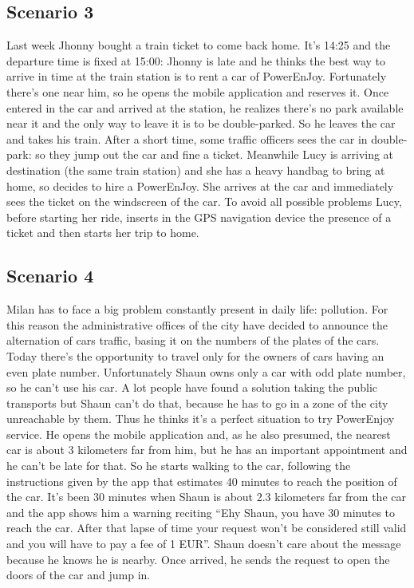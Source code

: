 \subsection{Scenario 3}
Last week Jhonny bought a train ticket to come back home.
It’s 14:25 and the departure time is fixed at 15:00: Jhonny is late and he thinks the best way to arrive in time at the train station is to rent a car of PowerEnJoy.
Fortunately there’s one near him, so he opens the mobile application and reserves it.
Once entered in the car and arrived at the station, he realizes there’s no park available near it and the only way to leave it is to be double-parked.
So he leaves the car and takes his train. After a short time, some traffic officers sees the car in double-park: so they jump out the car and fine a ticket.
Meanwhile Lucy is arriving at destination (the same train station) and she has a heavy handbag to bring at home, so decides to hire a PowerEnJoy.
She arrives at the car and immediately sees the ticket on the windscreen of the car.
To avoid all possible problems Lucy, before starting her ride, inserts in the GPS navigation device the presence of a ticket and then starts her trip to home.

\subsection{Scenario 4}
Milan has to face a big problem constantly present in daily life: pollution.
For this reason the administrative offices of the city have decided to announce the alternation of cars traffic, basing it on the numbers of the plates of the cars.
Today there’s the opportunity to travel only for the owners of cars having an even plate number.
Unfortunately Shaun owns only a car with odd plate number, so he can’t use his car.
A lot people have found a solution taking the public transports but Shaun can’t do that, because he has to go in a zone of the city unreachable by them.
Thus he thinks it’s a perfect situation to try PowerEnjoy service.
He opens the mobile application and, as he also presumed, the nearest car is about 3 kilometers far from him, but he has an important appointment and he can’t be late for that.
So he starts walking to the car, following the instructions given by the app that estimates 40 minutes to reach the position of the car.
It’s been 30 minutes when Shaun is about 2.3 kilometers far from the car and the app shows him a warning reciting “Ehy Shaun, you have 30 minutes to reach the car.
After that lapse of time your request won’t be considered still valid and you will have to pay a fee of 1 EUR”.
Shaun doesn’t care about the message because he knows he is nearby.
Once arrived, he sends the request to open the doors of the car and jump in.

